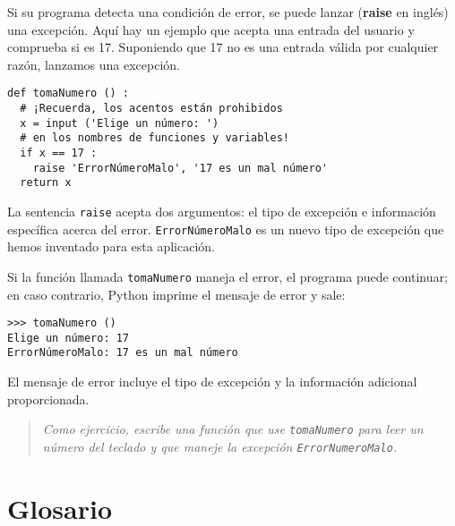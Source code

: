 Si su programa detecta una condición de error, se puede lanzar 
({\bf raise} en inglés) una excepción. Aquí hay un ejemplo que acepta una entrada
del usuario y comprueba si es 17. Suponiendo que 17 no es una entrada válida
por cualquier razón, lanzamos una excepción.

\begin{verbatim}
def tomaNumero () :                 
  # ¡Recuerda, los acentos están prohibidos
  x = input ('Elige un número: ')   
  # en los nombres de funciones y variables!
  if x == 17 :
    raise 'ErrorNúmeroMalo', '17 es un mal número'
  return x
\end{verbatim}
%
La sentencia \texttt{raise} acepta dos argumentos: el tipo de excepción
e información específica acerca del error. \texttt{ErrorNúmeroMalo}
es un nuevo tipo de excepción que hemos inventado para esta aplicación.

Si la función llamada \texttt{tomaNumero} maneja el error, el programa
puede continuar; en caso contrario, Python imprime el mensaje de error
y sale:

\beforeverb
\begin{verbatim}
>>> tomaNumero ()
Elige un número: 17
ErrorNúmeroMalo: 17 es un mal número
\end{verbatim}
\afterverb
%
El mensaje de error incluye el tipo de excepción y la información
adicional proporcionada.

\begin{quote}
{\em Como ejercicio, escribe una función que use \texttt{tomaNumero}
para leer un número del teclado y que maneje la excepción
\texttt{ErrorNumeroMalo}.}
\end{quote}


\section{Glosario}


